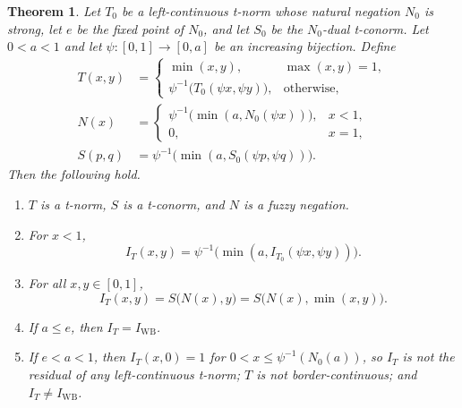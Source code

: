 \documentclass[11pt]{amsart}
\numberwithin{equation}{section}
\newtheorem{theorem}{Theorem}[section]
\theoremstyle{definition}
\theoremstyle{remark}
\newcommand{\IWB}{I_{\mathrm{WB}}}
\begin{document}
\begin{theorem}\label{thm:C}
Let $T_0$ be a left-continuous t-norm whose natural negation $N_0$ is strong,
let $e$ be the fixed point of $N_0$, and let $S_0$ be the $N_0$-dual
t-conorm. Let $0<a<1$ and let $\psi\colon[0,1]\to[0,a]$ be an increasing
bijection. Define
\begin{align}
  T(x,y)&=\begin{cases} \min(x,y), & \max(x,y)=1,\\
            \psi^{-1}\bigl(T_0(\psi x,\psi y)\bigr), & \text{otherwise},\end{cases}
  \label{eq:C-T}\\[2pt]
  N(x)&=\begin{cases} \psi^{-1}\bigl(\min(a,N_0(\psi x))\bigr), & x<1,\\
            0, & x=1,\end{cases}
  \label{eq:C-N}\\[2pt]
  S(p,q)&=\psi^{-1}\bigl(\min(a,S_0(\psi p,\psi q))\bigr).
  \label{eq:C-S}
\end{align}
Then the following hold.
\begin{enumerate}[label=\textup{(\arabic*)},leftmargin=*,itemsep=2pt]
\item $T$ is a t-norm, $S$ is a t-conorm, and $N$ is a fuzzy negation.
\item For $x<1$,
  \begin{equation}\label{eq:C-res}
    I_T(x,y)=\psi^{-1}\bigl(\min(a,I_{T_0}(\psi x,\psi y))\bigr).
  \end{equation}
\item For all $x,y\in[0,1]$,
  \begin{equation}\label{eq:C-rep}
    I_T(x,y)=S\bigl(N(x),y\bigr)=S\bigl(N(x),\min(x,y)\bigr).
  \end{equation}
\item If $a\le e$, then $I_T=\IWB$.
\item If $e<a<1$, then $I_T(x,0)=1$ for $0<x\le\psi^{-1}(N_0(a))$, so $I_T$
  is not the residual of any left-continuous t-norm; $T$ is not
  border-continuous; and $I_T\ne\IWB$.
\end{enumerate}
\end{theorem}
\end{document}
